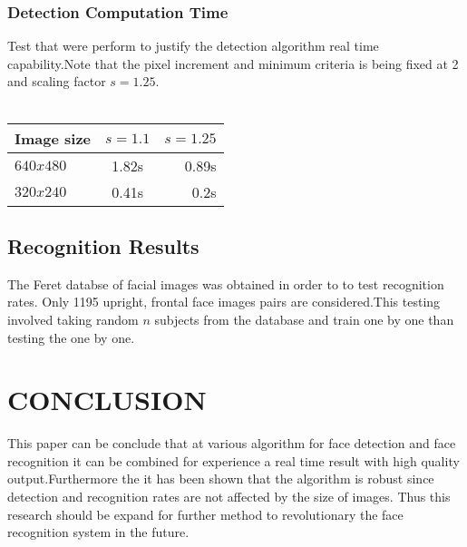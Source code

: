 \documentclass[a4paper,11pt]{article}
\begin{document}
\subsubsection{Detection Computation Time}
\hspace{1cm} Test that were perform to justify the detection algorithm real time capability.Note that the pixel increment and minimum criteria is being fixed at 2 and scaling factor $s=1.25$.\\\\
\begin{tabular}{|l|c|r|}
\hline
Image size & $s=1.1$ & $s=1.25$\\
\hline
$640x480$ & 1.82s & 0.89s\\
\hline
$320x240$ & 0.41s & 0.2s\\
\hline 
\end{tabular}

\subsection{Recognition Results}
\hspace{1cm} The Feret databse of facial images was obtained in order to to test recognition rates. Only 1195 upright, frontal face images pairs are considered.This testing involved taking random $n$ subjects from the database and train one by one than testing the one by one.


\section{CONCLUSION}
\hspace{1cm}This paper can be conclude that at various algorithm for face detection and face recognition it can be combined for experience a real time result with high quality output.Furthermore the it has been shown that the algorithm is robust since detection and recognition rates are not affected by the size of images. Thus this research should be expand for further method to revolutionary the face recognition system in the future.
\end{document}
